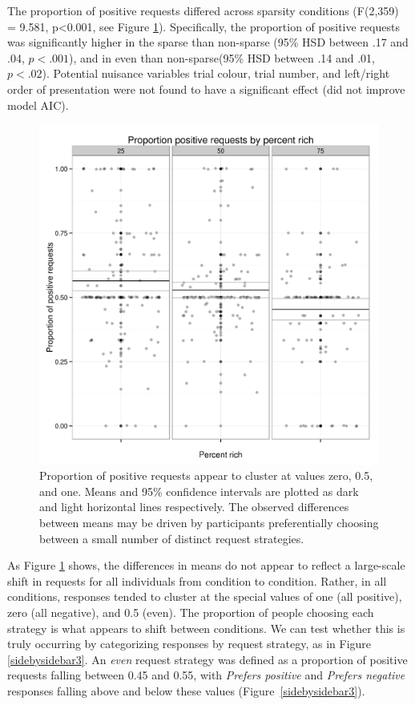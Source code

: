 \documentclass[10pt,letterpaper]{article}
\begin{document}
The proportion of positive requests differed across sparsity conditions (F(2,359) = 9.581, p<0.001, see Figure \ref{propposdots}). Specifically, the proportion of positive requests was significantly higher in the {\sc sparse} than {\sc non-sparse} (95\% HSD between .17 and .04, $p<.001$), and in {\sc even} than {\sc non-sparse}(95\% HSD between .14 and .01, $p<.02$). Potential nuisance variables trial colour, trial number, and left/right order of presentation were not found to have a significant effect (did not improve model AIC).


\begin{figure}[t]
\centering
\includegraphics[width=.5\textwidth]{propposplotlines.png}
\caption{Proportion of positive requests appear to cluster at values zero, 0.5, and one. Means and 95\% confidence intervals are plotted as dark and light horizontal lines respectively. The observed differences between means may be driven by participants preferentially choosing between a small number of distinct request strategies.}
\label{propposdots}
\end{figure}

As Figure \ref{propposdots} shows, the differences in means do not appear to reflect a large-scale shift in requests for all individuals from condition to condition. Rather, in all conditions, responses tended to cluster at the special values of one (all positive), zero (all negative), and 0.5 (even). The proportion of people choosing each strategy is what appears to shift between conditions. We can test whether this is truly occurring by categorizing responses by request strategy, as in Figure \ref{sidebysidebar3}. An \textit{even} request strategy was defined as a proportion of positive requests falling between 0.45 and 0.55, with \textit{Prefers positive} and \textit{Prefers negative} responses falling above and below these values (Figure~\ref{sidebysidebar3}).
\end{document}
